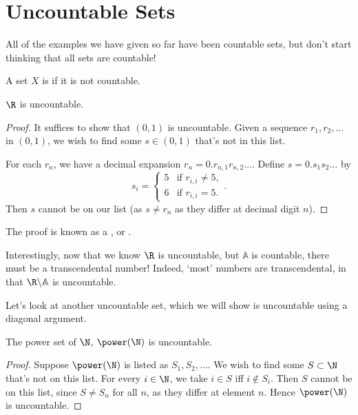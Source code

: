 \documentclass[a4paper]{scrreprt}
\begin{document}
\section{Uncountable Sets}

All of the examples we have given so far have been countable sets, but don't start thinking that all sets are countable! 

\begin{definition}[Uncountability]
	A set $X$ is  if it is not countable.
\end{definition}


\begin{theorem}
	$\R$ is uncountable.
\end{theorem}
\begin{proof}
	It suffices to show that $(0, 1)$ is uncountable. Given a sequence $r_1, r_2, \dots$ in $(0, 1)$, we wish to find some $s \in (0, 1)$ that's not in this list.
	
	For each $r_n$, we have a decimal expansion $r_n = 0.r_{n,1} r_{n,2}\dots$. Define $s = 0.s_1 s_2\dots$ by
	$$
	s_i = \begin{cases}
		5 &\mbox{if } r_{i, i} \neq 5, \\
		6 &\mbox{if } r_{i, i} = 5.
	   \end{cases}.
	$$
	Then $s$ cannot be on our list (as $s \neq r_n$ as they differ at decimal digit $n$).
\end{proof}

The proof is known as a , or . 

Interestingly, now that we know $\R$ is uncountable, but $\mathbb{A}$ is countable, there must be a transcendental number! Indeed, `most' numbers are transcendental, in that $\R \backslash \mathbb{A}$ is uncountable.

Let's look at another uncountable set, which we will show is uncountable using a diagonal argument.

\begin{theorem}
	The power set of $\N$, $\power(\N)$ is uncountable.
\end{theorem}
\begin{proof}
	Suppose $\power(\N)$ is listed as $S_1, S_2, \dots$. We wish to find some $S \subset \N$ that's not on this list.
	For every $i \in \N$, we take $i \in S$ iff $i \not \in S_i$. Then $S$ cannot be on this list, since $S \neq S_n$ for all $n$, as they differ at element $n$.
	Hence $\power(\N)$ is uncountable.
\end{proof}
\end{document}
